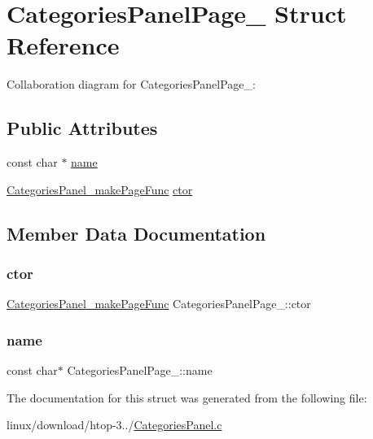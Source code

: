 \hypertarget{structCategoriesPanelPage__}{}\section{Categories\+Panel\+Page\+\_\+ Struct Reference}
\label{structCategoriesPanelPage__}


Collaboration diagram for Categories\+Panel\+Page\+\_\+\+:
\subsection*{Public Attributes}
\begin{DoxyCompactItemize}
\item 
const char $\ast$ \hyperlink{structCategoriesPanelPage___ae7b1623a4abba0b40f4c4b46934c20ad}{name}
\item 
\hyperlink{CategoriesPanel_8c_afc761f169c10a033db2e3e07604239c5}{Categories\+Panel\+\_\+make\+Page\+Func} \hyperlink{structCategoriesPanelPage___aeee5b1981e2272b21a0a89a853a27c77}{ctor}
\end{DoxyCompactItemize}


\subsection{Member Data Documentation}
\mbox{\label{structCategoriesPanelPage___aeee5b1981e2272b21a0a89a853a27c77}} 
\subsubsection{\texorpdfstring{ctor}{ctor}}
{\footnotesize\ttfamily \hyperlink{CategoriesPanel_8c_afc761f169c10a033db2e3e07604239c5}{Categories\+Panel\+\_\+make\+Page\+Func} Categories\+Panel\+Page\+\_\+\+::ctor}

\mbox{\label{structCategoriesPanelPage___ae7b1623a4abba0b40f4c4b46934c20ad}} 
\subsubsection{\texorpdfstring{name}{name}}
{\footnotesize\ttfamily const char$\ast$ Categories\+Panel\+Page\+\_\+\+::name}



The documentation for this struct was generated from the following file\+:\begin{DoxyCompactItemize}
\item 
linux/download/htop-\/3../\hyperlink{CategoriesPanel_8c}{Categories\+Panel.\+c}\end{DoxyCompactItemize}
